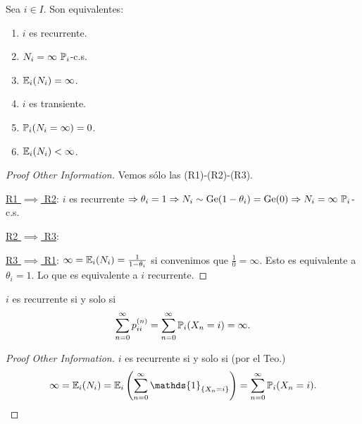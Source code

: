 \begin{theorem}
	Sea $i \in I$. Son equivalentes:
	\begin{enumerate}
		\item[(R1)] $i$ es recurrente.

		\item[(R2)] $N_{i} = \infty \ \mbb{P}_{i}$-c.s.

		\item[(R3)] $\mathbb{E}_{i}(N_{i}) = \infty$.

		\item[(T1)] $i$ es transiente.

		\item[(T2)] $\mathbb{P}_{i}(N_{i} = \infty) = 0$.

		\item[(T3)] $\mathbb{E}_{i}(N_{i}) < \infty$.
	\end{enumerate}
\end{theorem}
\begin{proof}[Proof Other Information]
	Vemos sólo las (R1)-(R2)-(R3). \par
	\underline{R1 $\implies$ R2}: $i$ es recurrente $\Rightarrow \theta_{i} = 1 \Rightarrow N_{i} \sim \operatorname{Ge}(1 - \theta_{i}) = \operatorname{Ge}(0) \Rightarrow N_{i} = \infty \ \mathbb{P}_{i}$-c.s. \par
	\underline{R2 $\implies$ R3}: \checkmark \par
	\underline{R3 $\implies$ R1}: $\infty = \mathbb{E}_{i}(N_{i}) = \frac{1}{1 - \theta_{i}}$ si convenimos que $\frac{1}{0} = \infty$. Esto es equivalente a $\theta_{i} = 1$. Lo que es equivalente a $i$ recurrente.
\end{proof}

\begin{corollary}
	$i$ es recurrente si y solo si
	\[ \sum_{n=0}^{\infty} p_{ii}^{(n)} = \sum_{n=0}^{\infty} \mathbb{P}_{i}(X_{n} = i) = \infty. \]
\end{corollary}
\begin{proof}[Proof Other Information]
	$i$ es recurrente si y solo si (por el Teo.)
	\[ \infty = \mbb{E}_{i}(N_{i}) = \mbb{E}_{i}\left( \sum_{n=0}^{\infty} \mathds{1}_{\{X_{n} = i\}} \right) = \sum_{n=0}^{\infty} \mbb{P}_{i}(X_{n} = i). \]
\end{proof}

